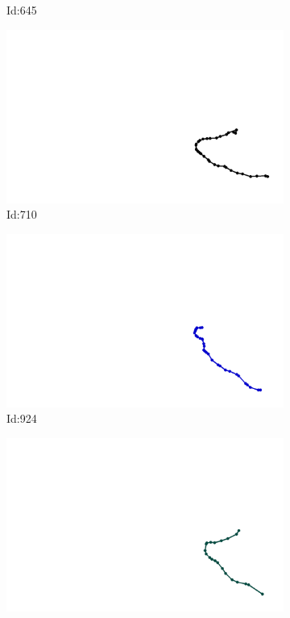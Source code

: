 \documentclass[12pt,twoside]{report}
\begin{document}
\begin{figure}
\begin{subfigure}[b]{0.20\textwidth}
\caption{Id:645}
\end{subfigure}
\begin{subfigure}[b]{0.20\textwidth}
\centering
\includegraphics[width=\textwidth]{../trajectories/710.png}
\caption{Id:710}
\end{subfigure}
\begin{subfigure}[b]{0.20\textwidth}
\centering
\includegraphics[width=\textwidth]{../trajectories/924.png}
\caption{Id:924}
\end{subfigure}
\begin{subfigure}[b]{0.20\textwidth}
\centering
\includegraphics[width=\textwidth]{../trajectories/944.png}

\end{subfigure}
\end{figure}
\end{document}
